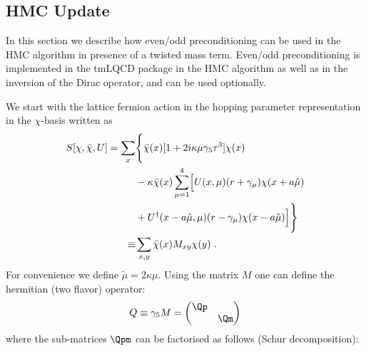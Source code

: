 \label{sec:eo}

\subsection{HMC Update}

In this section we describe how even/odd
\cite{DeGrand:1990dk,Jansen:1997yt} preconditioning can be used in the
HMC algorithm in 
presence of a twisted mass term. Even/odd preconditioning is
implemented in the tmLQCD package in the HMC algorithm as well as in
the inversion of the Dirac operator, and can be used optionally.

We start with the lattice fermion action in the hopping parameter
representation in the $\chi$-basis written as
\begin{equation}
  \label{eq:eo0}
    \begin{split}
    S[\chi,\bar\chi,U] = \sum_x & \Biggl\{ \bar\chi(x)[1+2i \kappa\mu\gamma_5\tau^3]\chi(x)  \Bigr. \\
    & -\kappa\bar\chi(x)\sum_{\mu = 1}^4\Bigl[ U(x,\mu)(r+\gamma_\mu)\chi(x+a\hat\mu)\bigr. \\
    & +\Bigl. \bigl. U^\dagger(x-a\hat\mu,\mu)(r-\gamma_\mu)\chi(x-a\hat\mu)\Bigr]
    \Biggr\} \\
    \equiv &\sum_{x,y}\bar\chi(x) M_{xy}\chi(y)\ .
  \end{split}
\end{equation}
For convenience we define
$\tilde\mu=2\kappa\mu$. Using the matrix $M$ one can define the
hermitian (two flavor) operator:
\begin{equation}
  \label{eq:eo1}
  Q\equiv \gamma_5 M = \begin{pmatrix}
    \Qp & \\\
    & \Qm \\
  \end{pmatrix}
\end{equation}
where the sub-matrices $\Qpm$ can be factorised as follows (Schur
decomposition): 
